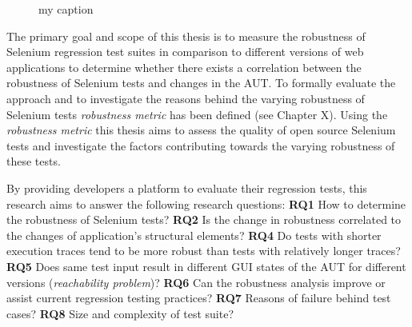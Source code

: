 \begin{figure}
\centering     %
{}
\vspace{-2mm}
\caption{my caption}
\label{fig:loginTest}
\end{figure} 


The primary goal and scope of this thesis is to measure the robustness of Selenium regression test suites in comparison to different versions of web applications to determine whether there exists a correlation between the robustness of Selenium tests and changes in the AUT. To formally evaluate the approach and to investigate the reasons behind the varying robustness of Selenium tests \textit{robustness metric} has been defined (see Chapter X). Using the \textit{robustness metric} this thesis aims to assess the quality of open source Selenium tests and investigate the factors contributing towards the varying robustness of these tests.

 By providing developers a platform to evaluate their regression tests, this research aims to answer the following research questions:
{\bfseries RQ1} How to determine the robustness of Selenium tests?
{\bfseries RQ2} Is the change in robustness correlated to the changes of application’s structural elements?
{\bfseries RQ4} Do tests with shorter execution traces tend to be more robust than tests with relatively longer traces?
{\bfseries RQ5} Does same test input result in different GUI states of the AUT for different versions (\textit{reachability problem})?
{\bfseries RQ6} Can the robustness analysis improve or assist current regression testing practices?
{\bfseries RQ7} Reasons of failure behind test cases?
{\bfseries RQ8} Size and complexity of test suite?

